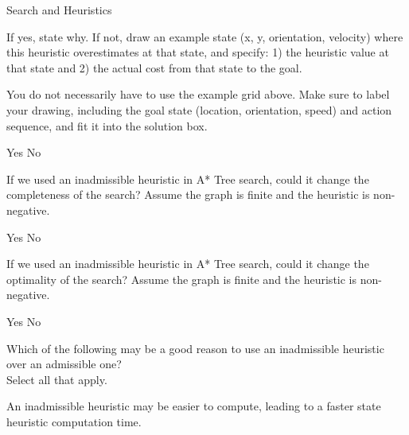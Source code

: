 \begin{problem} {Search and Heuristics}
\begin{question}[4]
If yes, state why. If not, draw an example state (x, y, orientation, velocity) where this heuristic overestimates at that state, and specify: 1) the heuristic value at that state and 2) the actual cost from that state to the goal.

You do not necessarily have to use the example grid above. Make sure to label your drawing, including the goal state (location, orientation, speed) and action sequence, and fit it into the solution box.

\hspace{5mm}
\solution{\emptycircle}{\OneeYes} Yes
\hspace{5mm}
\solution{\emptycircle}{\OneeNo} No

\end{question}

\begin{question}[1]
If we used an inadmissible heuristic in A* Tree search, could it change the completeness of the search? Assume the graph is finite and the heuristic is non-negative.

\hspace{5mm}
\solution{\emptycircle}{\OnefYes} Yes
\hspace{5mm}
\solution{\emptycircle}{\OnefNo} No

\solution{}{\Onefreason}
\end{question}

\begin{question}[1]
If we used an inadmissible heuristic in A* Tree search, could it change the optimality of the search? Assume the graph is finite and the heuristic is non-negative.

\hspace{5mm}
\solution{\emptycircle}{\OnegYes} Yes
\hspace{5mm}
\solution{\emptycircle}{\OnegNo} No

\solution{}{\Onegreason}
\end{question}



\begin{question}[3]
Which of the following may be a good reason to use an inadmissible heuristic over an admissible one? \\Select all that apply.

\solution{\emptysquare}{\OnehA} An inadmissible heuristic may be easier to compute, leading to a faster state heuristic computation time. \\



\end{question}
\end{problem}
